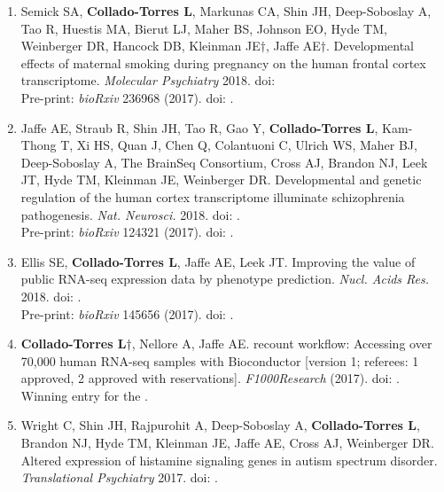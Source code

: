 \begin{enumerate}
        \item Semick SA, \textbf{Collado-Torres L}, Markunas CA, Shin JH, Deep-Soboslay A, Tao R, Huestis MA, Bierut LJ, Maher BS, Johnson EO, Hyde TM, Weinberger DR, Hancock DB, Kleinman JE$\dagger$, Jaffe AE$\dagger$. Developmental effects of maternal smoking during pregnancy on the human frontal cortex transcriptome. \emph{Molecular Psychiatry} 2018. doi: 
        \\ Pre-print: \emph{bioRxiv} 236968 (2017). doi: .
        
        \item Jaffe AE, Straub R, Shin JH, Tao R, Gao Y, \textbf{Collado-Torres L}, Kam-Thong T, Xi HS, Quan J, Chen Q, Colantuoni C, Ulrich WS, Maher BJ, Deep-Soboslay A, The BrainSeq Consortium, Cross AJ, Brandon NJ, Leek JT, Hyde TM, Kleinman JE, Weinberger DR. Developmental and genetic regulation of the human cortex transcriptome illuminate schizophrenia pathogenesis. \emph{Nat. Neurosci.} 2018. doi: .
        \\ Pre-print: \emph{bioRxiv} 124321 (2017). doi: .
        
        \item Ellis SE, \textbf{Collado-Torres L}, Jaffe AE, Leek JT. Improving the value of public RNA-seq expression data by phenotype prediction. \emph{Nucl. Acids Res.} 2018. doi: .
        \\ Pre-print: \emph{bioRxiv} 145656 (2017). doi: .
        
        \item \textbf{Collado-Torres L}$\dagger$, Nellore A, Jaffe AE. 
        recount workflow: Accessing over 70,000 human RNA-seq samples with Bioconductor [version 1; referees: 1 approved, 2 approved with reservations]. \emph{F1000Research} (2017). doi: .
        \\ Winning entry for the .
        
        \item Wright C, Shin JH, Rajpurohit A, Deep-Soboslay A, \textbf{Collado-Torres L}, Brandon NJ, Hyde TM, Kleinman JE, Jaffe AE, Cross AJ, Weinberger DR. Altered expression of histamine signaling genes in autism spectrum disorder. \emph{Translational Psychiatry} 2017. doi: .
        

\end{enumerate}
